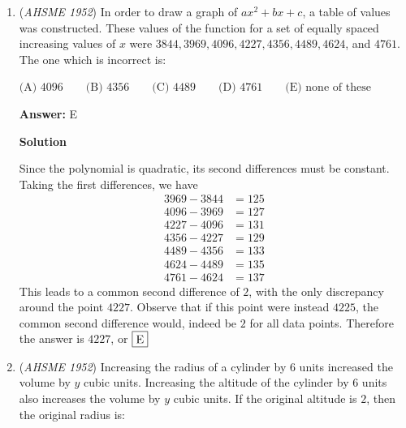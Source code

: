 \begin{enumerate}
 Since $x+y=\frac{p}{2}$, $(x+y)^2=\frac{p^2}{4} \Rightarrow x^2+2xy+y^2=\frac{p^2}{4}$.

 Rearranging to solve for $2xy$ gives $2xy = \frac{p^2}{4}-d^2$.

 Rearranging $(x-y)^2$ in terms of the defined variables becomes $(x-y)^2 = d^2 - (\frac{p^2}{4}-d^2)$. 

 In order to get (x-y), we have to take the square root of the expression and simplify. 

 $(x-y)=\sqrt{2d^2-\frac{p^2}{4}} \Rightarrow (x-y)=\sqrt{\frac{8d^2-p^2}{4}}$ $\Rightarrow$ $(x-y)=\frac{\sqrt{8d^2+p^2}}{2}$ $\Rightarrow$$\fbox{A}$.

 


	\item (\textit{AHSME 1952}) In order to draw a graph of $ax^2+bx+c$, a table of values was constructed. These values of the function for a set of equally spaced increasing values of $x$ were $3844, 3969, 4096, 4227, 4356, 4489, 4624$, and $4761$. The one which is incorrect is: 


 $\text{(A) } 4096 \qquad \text{(B) } 4356 \qquad \text{(C) } 4489 \qquad \text{(D) } 4761 \qquad \text{(E) } \text{none of these}$

 \textbf{Answer: }E



\textbf{Solution}

Since the polynomial is quadratic, its second differences must be constant. Taking the first differences, we have
 \begin{align*} 3969-3844&=125 \\ 4096-3969&=127 \\ 4227-4096&=131 \\ 4356-4227&=129 \\ 4489-4356&=133 \\ 4624-4489&=135 \\ 4761-4624&=137 \end{align*}
This leads to a common second difference of $2$, with the only discrepancy around the point $4227$. Observe that if this point were instead $4225$, the common second difference would, indeed be $2$ for all data points. Therefore the answer is $4227$, or $\fbox{E}$



	\item (\textit{AHSME 1952}) Increasing the radius of a cylinder by $6$ units increased the volume by $y$ cubic units. Increasing the altitude of the cylinder by $6$ units also increases the volume by $y$ cubic units. If the original altitude is $2$, then the original radius is: 



\end{enumerate}
